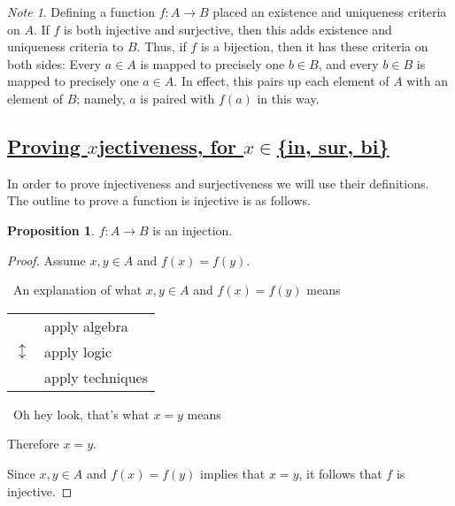 \documentclass{amsart}
\theoremstyle{definition}
\theoremstyle{definition}
\newtheorem*{prpn}{Proposition}
\theoremstyle{remark}
\newtheorem*{note}{Note}
\begin{document}
\begin{note}
      Defining a function $f:A\rightarrow B$ placed an existence and uniqueness criteria on $A$. If $f$ is both injective and surjective, then this adds existence and uniqueness criteria to $B$. Thus, if $f$ is a bijection, then it has these criteria on both sides: Every $a \in A$ is mapped to precisely one $b \in B$, and every $b\in B$ is mapped to precisely one $a \in A$. In effect, this pairs up each element of $A$ with an element of $B$; namely, $a$ is paired with $f(a)$ in this way.
\end{note}













\bigskip \bigskip \bigskip \bigskip

\subsection{\underline{Proving $x$jectiveness, for $x\in$\{in, sur, bi\}}}\hspace*{\fill}

In order to prove injectiveness and surjectiveness we will use their definitions. The outline to prove a function is injective is as follows.

\begin{prpn}
      $f:A\rightarrow B$ is an injection.
\end{prpn}

\begin{proof}
      Assume $x,y\in A$ and $f(x)=f(y)$.

      \begin{center}
            \guillemotleft\ An explanation of what $x,y\in A$ and $f(x)=f(y)$ means \guillemotright
      \end{center}

            \begin{center}
            \begin{tabular}{r l}
                  \multirow{3}{*}{\huge $\updownarrow$} & apply algebra \\
                  & apply logic \\
                  & apply techniques \\
            \end{tabular}
            \end{center}

            \begin{center}
                  \guillemotleft\ Oh hey look, that's what $x=y$ means \guillemotright
            \end{center}

            Therefore $x = y$.

            Since $x,y\in A$ and $f(x)=f(y)$ implies that $x = y$, it follows that $f$ is injective.

\end{proof}
\end{document}
